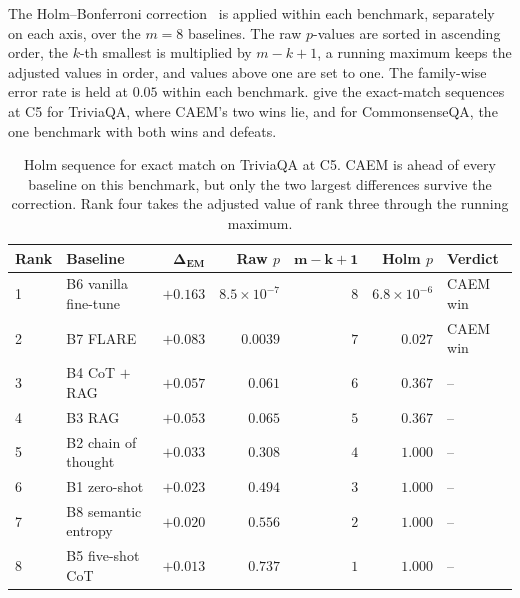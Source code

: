 The Holm--Bonferroni correction~\cite{holm1979simple} is applied within each benchmark, separately on each axis, over the $m = 8$ baselines. The raw $p$-values are sorted in ascending order, the $k$-th smallest is multiplied by $m - k + 1$, a running maximum keeps the adjusted values in order, and values above one are set to one. The family-wise error rate is held at $0.05$ within each benchmark.  give the exact-match sequences at C5 for TriviaQA, where CAEM's two wins lie, and for CommonsenseQA, the one benchmark with both wins and defeats.

\begin{table}[H]
\centering\footnotesize
\setlength{\tabcolsep}{4pt}
\begin{tabular}{@{}llrrrrl@{}}
\toprule
\textbf{Rank} & \textbf{Baseline} & $\boldsymbol{\Delta_{\text{EM}}}$ & \textbf{Raw $p$} & $\boldsymbol{m-k+1}$ & \textbf{Holm $p$} & \textbf{Verdict} \\
\midrule
1 & B6 vanilla fine-tune & $+0.163$ & $8.5 \times 10^{-7}$ & $8$ & $6.8 \times 10^{-6}$ & CAEM win \\
2 & B7 FLARE & $+0.083$ & $0.0039$ & $7$ & $0.027$ & CAEM win \\
3 & B4 CoT $+$ RAG & $+0.057$ & $0.061$ & $6$ & $0.367$ & -- \\
4 & B3 RAG & $+0.053$ & $0.065$ & $5$ & $0.367$ & -- \\
5 & B2 chain of thought & $+0.033$ & $0.308$ & $4$ & $1.000$ & -- \\
6 & B1 zero-shot & $+0.023$ & $0.494$ & $3$ & $1.000$ & -- \\
7 & B8 semantic entropy & $+0.020$ & $0.556$ & $2$ & $1.000$ & -- \\
8 & B5 five-shot CoT & $+0.013$ & $0.737$ & $1$ & $1.000$ & -- \\
\bottomrule
\end{tabular}
\caption[Holm sequence on TriviaQA at C5.]{Holm sequence for exact match on TriviaQA at C5. CAEM is ahead of every baseline on this benchmark, but only the two largest differences survive the correction. Rank four takes the adjusted value of rank three through the running maximum.}
\label{tab:app-sig-holm-tqa}
\end{table}

